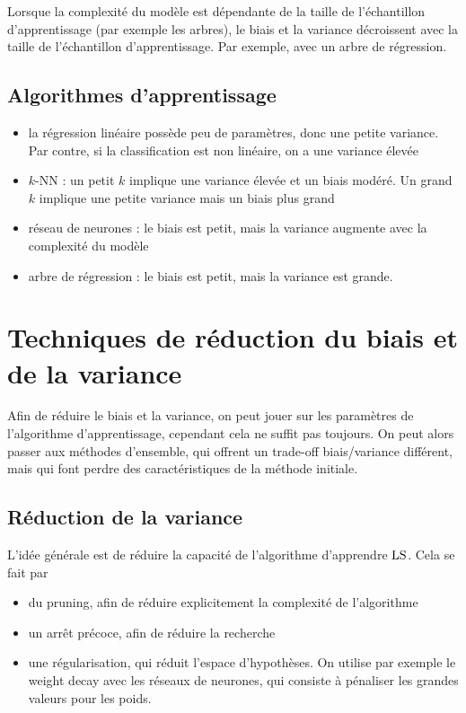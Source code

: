 		
		Lorsque la complexité du modèle est dépendante de la taille de l'échantillon d'apprentissage (par exemple les arbres), le biais et la variance décroissent avec la taille de l'échantillon d'apprentissage. Par exemple, avec un arbre de régression.
		
		
		\subsection{Algorithmes d'apprentissage}
		
		
		
		\begin{itemize}
			\item la régression linéaire possède peu de paramètres, donc une petite variance. Par contre, si la classification est non linéaire, on a une variance élevée
			\item $k$-NN : un petit $k$ implique une variance élevée et un biais modéré. Un grand $k$ implique une petite variance mais un biais plus grand
			\item réseau de neurones : le biais est petit, mais la variance augmente avec la complexité du modèle
			\item arbre de régression : le biais est petit, mais la variance est grande.
		\end{itemize}
	\section{Techniques de réduction du biais et de la variance}
	
	Afin de réduire le biais et la variance, on peut jouer sur les paramètres de l'algorithme d'apprentissage, cependant cela ne suffit pas toujours. On peut alors passer aux méthodes d'ensemble, qui offrent un trade-off biais/variance différent, mais qui font perdre des caractéristiques de la méthode initiale.
	
		\subsection{Réduction de la variance}
		
		L'idée générale est de réduire la capacité de l'algorithme d'apprendre $\text{LS}$. Cela se fait par
		
		\begin{itemize}
			\item du pruning, afin de réduire explicitement la complexité de l'algorithme
			\item un arrêt précoce, afin de réduire la recherche
			\item une régularisation, qui réduit l'espace d'hypothèses. On utilise par exemple le weight decay avec les réseaux de neurones, qui consiste à pénaliser les grandes valeurs pour les poids.
		\end{itemize}
		
